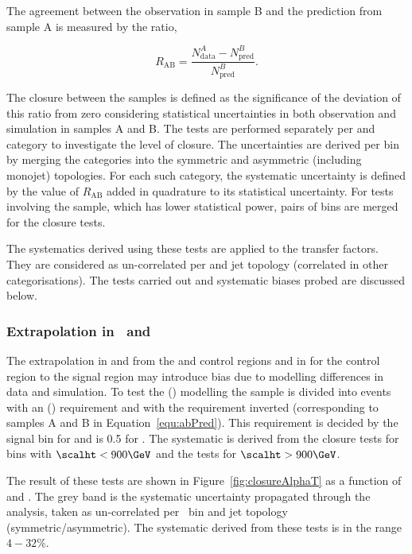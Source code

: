 The agreement between the observation in sample B and the prediction from sample A is measured by the ratio, 

\begin{equation}
R_{\text{AB}} = \frac{N^{A}_{\text{data}}-N^{B}_{\text{pred}}}{N^{B}_{\text{pred}}}.
\end{equation}


The closure between the samples is defined as the significance of the deviation of this ratio from zero 
considering statistical uncertainties in both observation and simulation in samples A and B.
The tests are performed separately per \njet and \scalht category to investigate the level of closure. 
The uncertainties are derived per \scalht bin by merging the \njet categories into 
the symmetric and asymmetric (including monojet) topologies. For each such category, the systematic
uncertainty is defined by the value of $R_{\text{AB}}$ added in quadrature to its statistical uncertainty.
For tests involving the \mmj sample, which has lower statistical power, pairs of \scalht bins 
are merged for the closure tests. 

The systematics derived using these tests are applied to the transfer factors. They are considered
as un-correlated per \scalht and jet topology (correlated in other categorisations). The tests carried 
out and systematic biases probed are discussed below.

\subsubsection{Extrapolation in \alphat~and \bdphi}

The extrapolation in \alphat and \bdphi from the \mj and \mmj control regions 
and in \bdphi for the \gj control region to the signal region may introduce bias
 due to modelling differences in data and simulation. To test the \alphat (\bdphi) modelling the \mj sample is divided 
into events with an \alphat (\bdphi) requirement and with the requirement inverted (corresponding
to samples A and B in Equation~\ref{equ:abPred}). This requirement is decided by the signal \scalht bin for 
\alphat and is 0.5 for \bdphi. The systematic is derived from the \alphat closure tests for
bins with $\scalht < 900 \GeV$ and the \bdphi tests for $\scalht > 900 \GeV$.

The result of these tests are shown in Figure~\ref{fig:closureAlphaT} as a function of \scalht and \njet. 
The grey band is the systematic uncertainty propagated through the analysis, 
taken as un-correlated per \scalht~bin and jet topology
(symmetric/asymmetric). The systematic derived from these tests is
in the range $4-32\%$.


